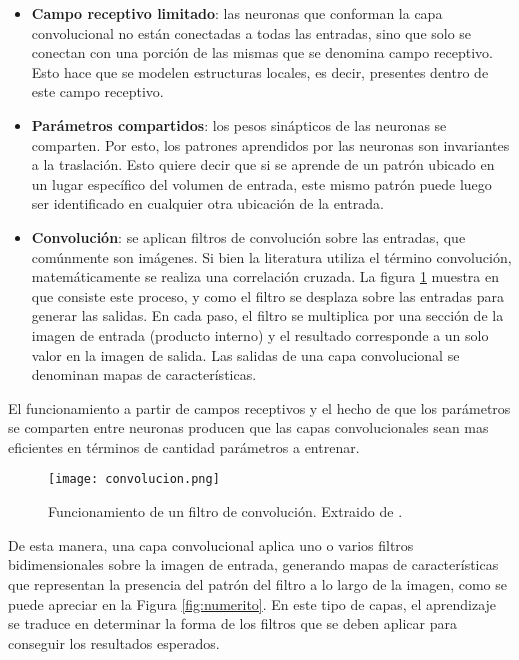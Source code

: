 \begin{itemize}

\item \textbf{Campo receptivo limitado}: las neuronas que conforman la capa convolucional no están conectadas a todas las entradas, sino que solo se conectan con una porción de las mismas que se denomina campo receptivo. Esto hace que se modelen estructuras locales, es decir, presentes dentro de este campo receptivo.  

\item \textbf{Parámetros compartidos}: los pesos sinápticos de las neuronas se comparten. Por esto, los patrones aprendidos por las neuronas son invariantes a la traslación. Esto quiere decir que si se aprende de un patrón ubicado en un lugar específico del volumen de entrada, este mismo patrón puede luego ser identificado en cualquier otra ubicación de la entrada.

\item \textbf{Convolución}: se aplican filtros de convolución sobre las entradas, que comúnmente son imágenes. Si bien la literatura utiliza el término convolución, matemáticamente se realiza una correlación cruzada. La figura \ref{fig:convolucion} muestra en que consiste este proceso, y como el filtro se desplaza sobre las entradas para generar las salidas. En cada paso, el filtro se multiplica por una sección de la imagen de entrada (producto interno) y el resultado corresponde a un solo valor en la imagen de salida. Las salidas de una capa convolucional se denominan mapas de características.  

\end{itemize}


El funcionamiento a partir de campos receptivos y el hecho de que los parámetros se comparten entre neuronas producen que las capas convolucionales sean mas eficientes en términos de cantidad parámetros a entrenar. 


\begin{figure}[H]
  \centering{}
  \texttt{[image: convolucion.png]}
  \caption{Funcionamiento de un filtro de convolución. Extraido de \cite{dragon}.}
  \label{fig:convolucion}
\end{figure}

De esta manera, una capa convolucional aplica uno o varios filtros bidimensionales sobre la imagen de entrada, generando mapas de características que representan la presencia del patrón del filtro a lo largo de la imagen, como se puede apreciar en la Figura \ref{fig:numerito}. En este tipo de capas, el aprendizaje se traduce en determinar la forma de los filtros que se deben aplicar para conseguir los resultados esperados. 

